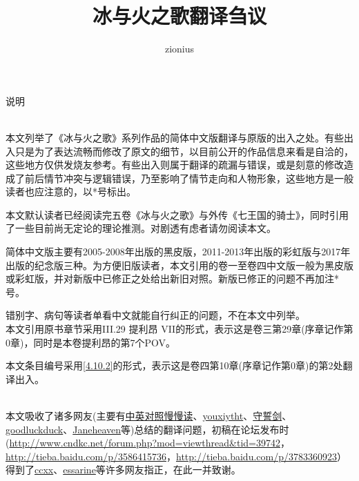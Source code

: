 \documentclass[12pt,a4paper]{article}
\begin{document}
 
\title{冰与火之歌翻译刍议}
\author{zionius}
\maketitle

\makeatletter
\def\t{\@ifnextchar[{\morethanonearg}{\noarg}}
\def\morethanonearg[#1]{\@ifnextchar[{\twoarg[#1]}{\onearg[#1]}}
\def\noarg{no arg}
\def\onearg[#1]{{\color{blue}#1}\\}
\def\twoarg[#1][#2]{{\color{blue}#1}\\{\color{red}#2}\\}
\makeatother

{\Large 说明}

\quad\\

\quad\quad 本文列举了《冰与火之歌》系列作品的简体中文版翻译与原版的出入之处。有些出入只是为了表达流畅而修改了原文的细节，以目前公开的作品信息来看是自洽的，这些地方仅供发烧友参考。有些出入则属于翻译的疏漏与错误，或是刻意的修改造成了前后情节冲突与逻辑错误，乃至影响了情节走向和人物形象，这些地方是一般读者也应注意的，以{\color{red}*}号标出。

\quad\quad 本文默认读者已经阅读完五卷《冰与火之歌》与外传《七王国的骑士》，同时引用了一些目前尚无定论的理论推测。对剧透有虑者请勿阅读本文。


\quad\quad 简体中文版主要有2005-2008年出版的黑皮版，2011-2013年出版的彩虹版与2017年出版的纪念版三种。为方便旧版读者，本文引用的卷一至卷四中文版一般为黑皮版或彩虹版，并对新版中已修正之处给出新旧对照。新版已修正的问题不再加注{\color{red}*}号。

\quad\quad 错别字、病句等读者单看中文就能自行纠正的问题，不在本文中列举。
\quad\\

\quad\quad 本文引用原书章节采用III.29 提利昂 VII的形式，表示这是卷三第29章(序章记作第0章)，同时是本卷提利昂的第7个POV。

\quad\quad 本文条目编号采用\ref{4.10.2}的形式，表示这是卷四第10章(序章记作第0章)的第2处翻译出入。

\newfontfamily{}
\def\UrlFont{\urlfontfamily}
\quad\\

\quad\quad 本文吸收了诸多网友(主要有\href{https://tieba.baidu.com/home/main?un=%E4%B8%AD%E8%8B%B1%E5%AF%B9%E7%85%A7%E6%85%A2%E6%85%A2%E8%AF%BB}{中英对照慢慢读}、\href{http://tieba.baidu.com/home/main?un=youxiytht}{youxiytht}、\href{https://tieba.baidu.com/home/main?un=%E5%AE%88%E8%AA%93%E5%89%91}{守誓剑}、\href{http://tieba.baidu.com/home/main?un=goodluckduck}{goodluckduck}、\href{https://www.zhihu.com/people/li-zhen-ni}{Janeheaven}等)总结的翻译问题，初稿在论坛发布时(\url{http://www.cndkc.net/forum.php?mod=viewthread&tid=39742}，\url{http://tieba.baidu.com/p/3586415736}，\url{http://tieba.baidu.com/p/3783360923}）得到了\href{http://weibo.com/u/1456965412}{ccxx}、\href{https://tieba.baidu.com/home/main?un=essarine}{essarine}等许多网友指正，在此一并致谢。
\end{document}

